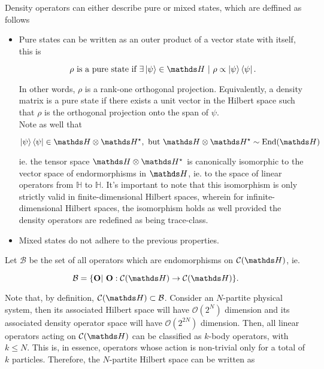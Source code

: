 \documentclass{homework}
\begin{document}
Density operators can either describe pure or mixed states, which are deffined as follows 

\begin{itemize}
    \item Pure states can be written as an outer product of a vector state with itself, this is 
    
    $$
    \rho \textnormal{ is a pure state if } \exists \ket{\psi} \in \hilbert \blanky | \blanky \rho \propto \ket{\psi} \bra{\psi}. 
    $$
    
    In other words, $\rho$ is a rank-one orthogonal projection. Equivalently, a density matrix is a pure state if there exists a unit vector in the Hilbert space such that $\rho$ is the orthogonal projection onto the span of $\psi$. \\
    
    Note as well that 
    
    $$
       \ket{\psi} \bra{\psi} \in \hilbert \otimes \hilbert^{\star}, \textnormal{ but } \hilbert \otimes \hilbert^{\star} \sim \textnormal{End}(\hilbert)
    $$
    
    ie. the tensor space $\hilbert \otimes \hilbert^{\star}$ is canonically isomorphic to the vector space of endormorphisms in $\hilbert$, ie. to the space of linear operators from $\mathds{H}$ to $\mathds{H}$.
    It's important to note that this isomorphism is only strictly valid in finite-dimensional Hilbert spaces, wherein for infinite-dimensional Hilbert spaces, the isomorphism holds as well provided the density operators are redefined as being trace-class.
    \item Mixed states do not adhere to the previous properties. 
\end{itemize}

Let $\mathcal{B}$ be the set of all operators which are endomorphisms on $\statespace$, ie. 

$$
\mathcal{B} = \{{\bf O} | \blanky {\bf O}: \statespace \rightarrow \statespace\}.
$$

Note that, by definition, $\statespace \subset \mathcal{B}$. Consider an $N$-partite physical system, then its associated Hilbert space will have $\mathcal{O}(2^N)$ dimension and its associated density operator space will have $\mathcal{O}(2^{2N})$ dimension. Then, all linear operators acting on $\statespace$ can be classified as $k$-body operators, with $k \leq N$. This is, in essence, operators whose action is non-trivial only for a total of $k$ particles. Therefore, the $N$-partite Hilbert space can be written as 
\end{document}
